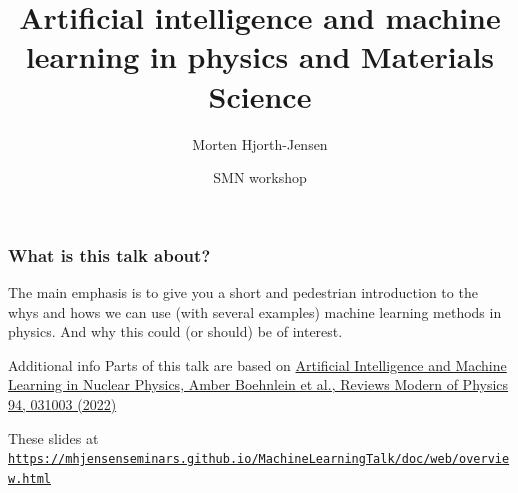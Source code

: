 \documentclass{beamer}
\begin{document}

\newcommand{\exercisesection}[1]{\subsection*{#1}}







\title{Artificial intelligence and machine learning in physics and Materials Science}


\author{Morten Hjorth-Jensen}

\date{SMN workshop
}

\begin{frame}
\titlepage
\end{frame}

\begin{frame}
\frametitle{What is this talk about?}

\begin{block}{}
The main emphasis is to give you a short and pedestrian introduction to the whys and hows we can use (with several examples) machine learning methods
in physics. And why this could (or should) be of interest. 
\end{block}

\begin{block}{Additional info }
Parts of this talk are based on \href{{https://journals.aps.org/rmp/abstract/10.1103/RevModPhys.94.031003}}{Artificial Intelligence and Machine Learning in Nuclear Physics, Amber Boehnlein et al., Reviews Modern of Physics 94, 031003 (2022)} 
\end{block}

\begin{block}{}
These slides at \href{{https://mhjensenseminars.github.io/MachineLearningTalk/doc/web/overview.html}}{\nolinkurl{https://mhjensenseminars.github.io/MachineLearningTalk/doc/web/overview.html}}
\end{block}
\end{frame}
\end{document}
